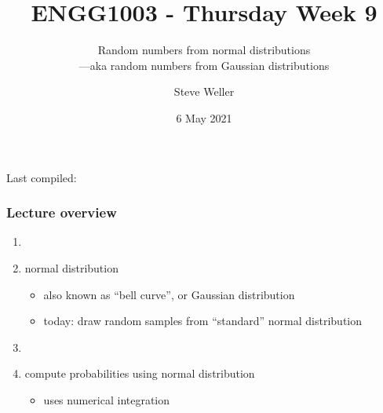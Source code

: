 \documentclass[english,14pt]{beamer}
\title{ENGG1003 - Thursday Week 9}
\subtitle{Random numbers from normal distributions \\
---aka random numbers from Gaussian distributions}
\author{Steve Weller}
\institute{University of Newcastle}
\date{6 May 2021}
\begin{document}
\begin{flushleft}
{\scriptsize Last compiled:~\DTMnow}
\vspace*{-5mm}
\end{flushleft}
\framebreak


\begin{frame}[fragile]

\frametitle{Lecture overview}
\begin{enumerate}

	\item[]
	
	\item normal distribution
	\begin{itemize}
		\item also known as ``bell curve'', or Gaussian distribution
		\item today: draw random samples from ``standard'' normal distribution
	\end{itemize}
	
	\item[]
	
	\item compute probabilities using normal distribution
	\begin{itemize}
		\item uses numerical integration
	\end{itemize}
	
%	
	
%	
	
\end{enumerate}

\end{frame}
\end{document}
